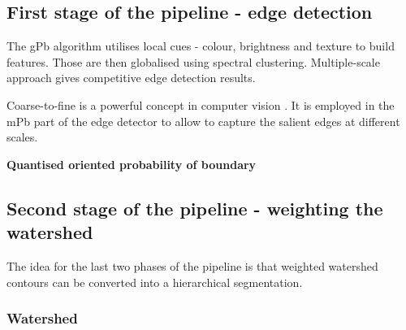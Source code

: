 \subsection{First stage of the pipeline - edge detection} %
\label{sec:ch3-gPb}
The gPb algorithm utilises local cues - colour, brightness and texture to build features. Those are then globalised using spectral clustering. Multiple-scale approach gives competitive edge detection results.

Coarse-to-fine is a powerful concept in computer vision \cite{Ren2008multi}. It is employed in the mPb part of the edge detector to allow to capture the salient edges at different scales.

\textbf{Quantised oriented probability of boundary}
\subsection{Second stage of the pipeline - weighting the watershed} %
The idea for the last two phases of the pipeline is that weighted watershed contours can be converted into a hierarchical segmentation.

\subsubsection{Watershed}
\label{sec:ch3-watershed}



